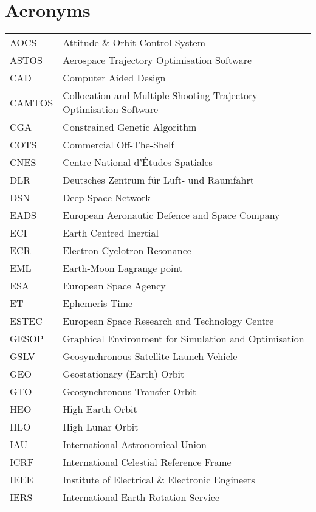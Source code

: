 \begin{longtable}{l p{}}
\end{longtable}

\section*{Acronyms}

\begin{longtable}{l p{}}

AOCS & Attitude \& Orbit Control System \\
ASTOS & Aerospace Trajectory Optimisation Software \\
CAD & Computer Aided Design \\
CAMTOS & Collocation and Multiple Shooting Trajectory Optimisation Software \\
CGA & Constrained Genetic Algorithm \\
COTS & Commercial Off-The-Shelf \\
CNES & Centre National d'\'{E}tudes Spatiales \\
DLR & Deutsches Zentrum f\"{u}r Luft- und Raumfahrt \\
DSN & Deep Space Network \\
EADS & European Aeronautic Defence and Space Company \\
ECI & Earth Centred Inertial \\
ECR & Electron Cyclotron Resonance \\
EML & Earth-Moon Lagrange point \\
ESA & European Space Agency \\
ET & Ephemeris Time \\
ESTEC &  European Space Research and Technology Centre \\
GESOP & Graphical Environment for Simulation and Optimisation \\
GSLV & Geosynchronous Satellite Launch Vehicle \\
GEO & Geostationary (Earth) Orbit \\
GTO & Geosynchronous Transfer Orbit \\
HEO & High Earth Orbit \\
HLO & High Lunar Orbit \\
IAU & International Astronomical Union \\
ICRF & International Celestial Reference Frame \\
IEEE & Institute of Electrical \& Electronic Engineers \\
IERS & International Earth Rotation Service \\

\end{longtable}
